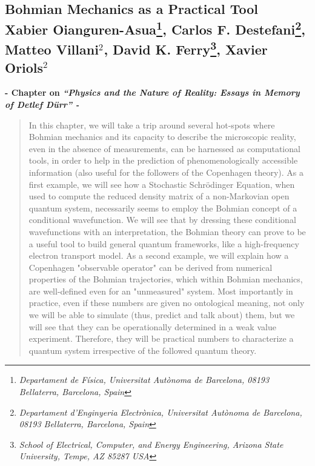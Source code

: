 \documentclass[11pt, a4paper]{article} %
\title{}
\date{\vspace{-11ex}}
\begin{document}
\begin{center}
\section*{ Bohmian Mechanics as a Practical Tool \vspace{0.2cm}\vspace{0.1cm}\\ \small Xabier Oianguren-Asua{\normalsize \footnote{\em Departament de Física, Universitat Autònoma de Barcelona, 08193 Bellaterra, Barcelona, Spain}}, Carlos F. Destefani{\normalsize\footnote{\em Departament d’Enginyeria Electrònica, Universitat Autònoma de Barcelona, 08193 Bellaterra, Barcelona, Spain}}, Matteo Villani{\normalsize$^2$}, David K. Ferry{\normalsize\footnote{\em School of Electrical, Computer, and Energy Engineering, Arizona State University, Tempe,
AZ 85287 USA}}, Xavier Oriols{\normalsize$^2$}}

\vspace{-0.3cm}
{\bf \small - Chapter on {\em “Physics and the Nature of Reality: Essays in Memory of Detlef Dürr” - }}\vspace{-0.32cm}
\end{center}
\vspace{0.4cm}
\begin{abstract}
\hspace{5mm}In this chapter, we will take a trip around several hot-spots where Bohmian mechanics and its capacity to describe the microscopic reality, even in the absence of measurements, can be harnessed as computational tools, in order to help in the prediction of phenomenologically accessible information (also useful for the followers of the Copenhagen theory). As a first example, we will see how a Stochastic Schrödinger Equation, when used to compute the reduced density matrix of a non-Markovian open quantum system, necessarily seems to employ the Bohmian concept of a conditional wavefunction. We will see that by dressing these conditional wavefunctions with an interpretation, the Bohmian theory can prove to be a useful tool to build general quantum frameworks, like a high-frequency electron transport model. As a second example, we will explain how a Copenhagen "observable operator" can be derived from numerical properties of the Bohmian trajectories, which within Bohmian mechanics, are well-defined even for an "unmeasured" system. Most importantly in practice, even if these numbers are given no ontological meaning, not only we will be able to simulate (thus, predict and talk about) them, but we will see that they can be operationally determined in a weak value experiment. Therefore, they will be practical numbers to characterize a quantum system irrespective of the followed quantum theory.
\end{abstract}
\end{document}
